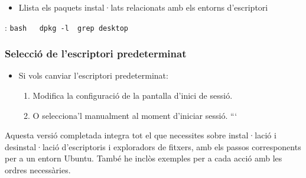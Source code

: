 \documentclass[
  a4paper,
]{article}
\providecommand{\tightlist}{%
  \setlength{\itemsep}{0pt}\setlength{\parskip}{0pt}}
\begin{document}
\begin{itemize}
\tightlist
\item
  Llista els paquets instal·lats relacionats amb els entorns
  d'escriptori
\end{itemize}

: \texttt{bash\ \ \ dpkg\ -l\ \textbar{}\ grep\ desktop}

\subsubsection{Selecció de l'escriptori
predeterminat}\label{selecciuxf3-de-lescriptori-predeterminat}

\begin{itemize}
\tightlist
\item
  Si vols canviar l'escriptori predeterminat:

  \begin{enumerate}
  \def\labelenumi{\arabic{enumi}.}
  \tightlist
  \item
    Modifica la configuració de la pantalla d'inici de sessió.
  \item
    O selecciona'l manualment al moment d'iniciar sessió. ```
  \end{enumerate}
\end{itemize}

Aquesta versió completada integra tot el que necessites sobre
instal·lació i desinstal·lació d'escriptoris i exploradors de fitxers,
amb els passos corresponents per a un entorn Ubuntu. També he inclòs
exemples per a cada acció amb les ordres necessàries.
\end{document}
